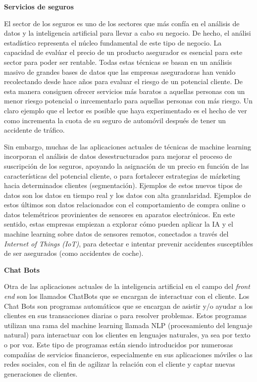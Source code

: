 \documentclass[]{article}
\begin{document}
\setlength\parskip{5ex}

\textbf{Servicios de seguros}

El sector de los seguros es uno de los sectores que más confía en el
análisis de datos y la inteligencia artificial para llevar a cabo su
negocio. De hecho, el análisi estadístico representa el núcleo
fundamental de este tipo de negocio. La capacidad de evalúar el precio
de un producto asegurador es esencial para este sector para poder ser
rentable. Todas estas técnicas se basan en un análisis masivo de grandes
bases de datos que las empresas aseguradoras han venido recolectando
desde hace años para evaluar el riesgo de un potencial cliente. De esta
manera consiguen ofrecer servicios más baratos a aquellas personas con
un menor riesgo potencial o inrcementarlo para aquellas personas con más
riesgo. Un claro ejemplo que el lector es posible que haya experimentado
es el hecho de ver como incrementa la cuota de su seguro de automóvil
después de tener un accidente de tráfico.

\setlength\parskip{5ex}

Sin embargo, muchas de las aplicaciones actuales de técnicas de machine
learning incorporan el análisis de datos desestructurados para mejorar
el proceso de suscripción de los seguros, apoyando la asignación de un
precio en función de las características del potencial cliente, o para
fortalecer estrategias de márketing hacia determinados clientes
(segmentación). Ejemplos de estos nuevos tipos de datos son los datos en
tiempo real y los datos con alta granularidad. Ejemplos de estos últimos
son datos relacionados con el comportamiento de compra online o datos
telemétricos provinientes de sensores en aparatos electrónicos. En este
sentido, estas empresas empiezan a explorar cómo pueden aplicar la IA y
el machine learning sobre datos de sensores remotos, conectados a través
del \emph{Internet of Things (IoT)}, para detectar e intentar prevenir
accidentes susceptibles de ser asegurados (como accidentes de coche).

\setlength\parskip{5ex}

\textbf{Chat Bots}

Otra de las aplicaciones actuales de la inteligencia artificial en el
campo del \emph{front end} son los llamados ChatBots que se encargan de
interactuar con el cliente. Los Chat Bots son programas automáticos que
se encargan de asistir y/o ayudar a los clientes en sus transacciones
diarias o para resolver problemas. Estos programas utilizan una rama del
machine learning llamada NLP (procesamiento del lenguaje natural) para
interactuar con los clientes en lenguajes naturales, ya sea por texto o
por voz. Este tipo de programas están siendo introducidos por numerosas
compañías de servicios financieros, especialmente en sus aplicaciones
móviles o las redes sociales, con el fin de agilizar la relación con el
cliente y captar nuevas generaciones de clientes.
\end{document}
